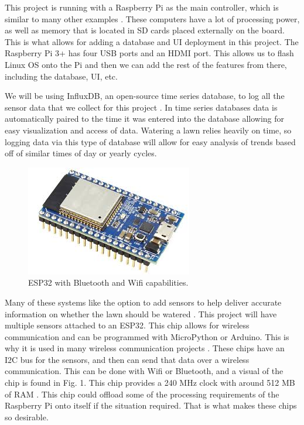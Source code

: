 \documentclass[letterpaper, 10 pt, conference]{ieeeconf}  %
\begin{document}
This project is running with a Raspberry Pi as the main controller, which is similar to many other examples \cite{SIP}. These computers have a lot of processing power, as well as memory that is located in SD cards placed externally on the board. This is what allows for adding a database and UI deployment in this project. The Raspberry Pi 3+ has four USB ports and an HDMI port. This allows us to flash Linux OS onto the Pi and then we can add the rest of the features from there, including the database, UI, etc. 

We will be using InfluxDB, an open-source time series database, to log all the sensor data that we collect for this project \cite{influxdb}. In time series databases data is automatically paired to the time it was entered into the database allowing for easy visualization and access of data. Watering a lawn relies heavily on time, so logging data via this type of database will allow for easy analysis of trends based off of similar times of day or yearly cycles.

\begin{figure}
    \centering
    \includegraphics[scale=.5]{ESP32.jpg}
    \caption{ESP32 with Bluetooth and Wifi capabilities.}
    \label{fig:esp_label}
\end{figure}

Many of these systems like the option to add sensors to help deliver accurate information on whether the lawn should be watered \cite{OpenSprinkler}. This project will have multiple sensors attached to an ESP32. This chip allows for wireless communication and can be programmed with MicroPython or Arduino. This is why it is used in many wireless communication projects \cite{OpenSprinkler}. These chips have an I2C bus for the sensors, and then can send that data over a wireless communication. This can be done with Wifi or Bluetooth, and a visual of the chip is found in Fig. 1. This chip provides a 240 MHz clock with around 512 MB of RAM \cite{micropy}. This chip could offload some of the processing requirements of the Raspberry Pi onto itself if the situation required. That is what makes these chips so desirable. 
\end{document}
